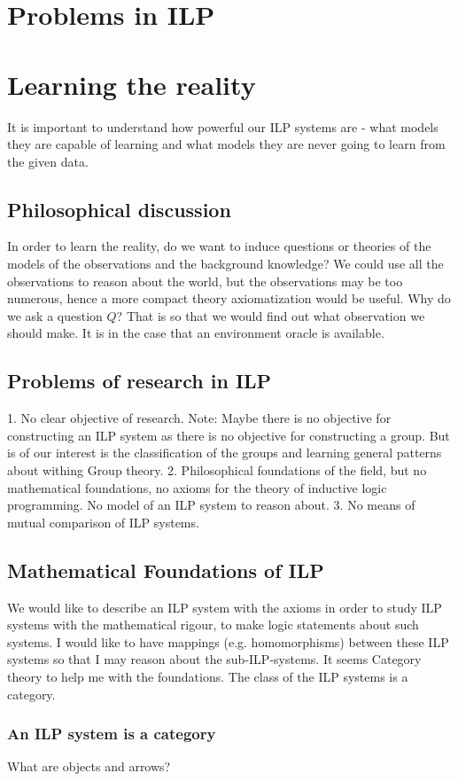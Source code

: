 \chapter{Problems in ILP}

\chapter{Learning the reality}
It is important to understand how powerful our ILP systems are - what models they are capable of learning and what models they are never going to learn from the given data.
\section{Philosophical discussion}
In order to learn the reality, do we want to induce questions or theories of the models of the observations and the background knowledge? We could use all the observations to reason about the world, but the observations may be too numerous, hence a more compact theory axiomatization would be useful.
Why do we ask a question $Q$? That is so that we would find out what observation we should make. It is in the case that an environment oracle is available.
\section{Problems of research in ILP}
1. No clear objective of research. Note: Maybe there is no objective for constructing an ILP system as there is no objective for constructing a group. But is of our interest is the classification of the groups and learning general patterns about withing Group theory.
2. Philosophical foundations of the field, but no mathematical foundations, no axioms for the theory of inductive logic programming. No model of an ILP system to reason about.
3. No means of mutual comparison of ILP systems.
\section{Mathematical Foundations of ILP}
We would like to describe an ILP system with the axioms in order to study ILP systems with the mathematical rigour, to make logic statements about such systems.
I would like to have mappings (e.g. homomorphisms) between these ILP systems so that I may reason about the sub-ILP-systems. It seems Category theory to help me with the foundations. The class of the ILP systems is a category.
\subsection{An ILP system is a category}
What are objects and arrows?
